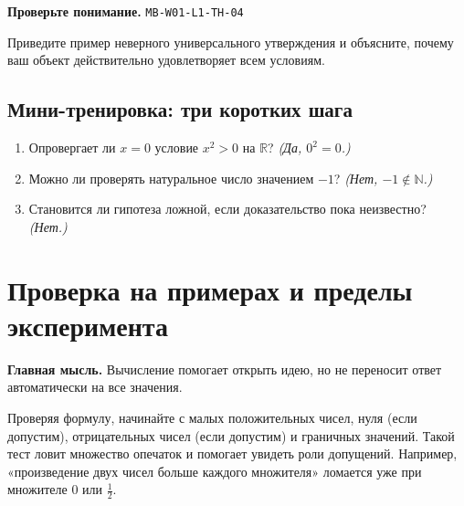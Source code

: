 \documentclass[11pt,a4paper,openany]{book}
\newcommand{\muid}[1]{\texttt{\footnotesize #1}}
\begin{document}
\begin{center}
\end{center}

\begin{learnbox}\textbf{Проверьте понимание.} \muid{MB-W01-L1-TH-04}\par Приведите пример неверного универсального утверждения и объясните, почему ваш объект действительно удовлетворяет всем условиям.\end{learnbox}

\subsection*{Мини-тренировка: три коротких шага}
\begin{enumerate}[label=\arabic*),leftmargin=*,itemsep=3pt]

\item Опровергает ли $x=0$ условие $x^2>0$ на $\mathbb R$? \textit{(Да, $0^2=0$.)}

\item Можно ли проверять натуральное число значением $-1$? \textit{(Нет, $-1\notin\mathbb N$.)}

\item Становится ли гипотеза ложной, если доказательство пока неизвестно? \textit{(Нет.)}

\end{enumerate}

\medskip

\section{Проверка на примерах и пределы эксперимента}\label{theory:5}

\begin{keybox}\textbf{Главная мысль.} Вычисление помогает открыть идею, но не переносит ответ автоматически на все значения.\end{keybox}

Проверяя формулу, начинайте с малых положительных чисел, нуля (если допустим), отрицательных чисел (если допустим) и граничных значений. Такой тест ловит множество опечаток и помогает увидеть роли допущений. Например, «произведение двух чисел больше каждого множителя» ломается уже при множителе $0$ или $\tfrac12$.
\end{document}
